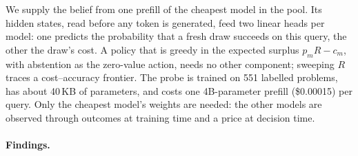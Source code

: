 \documentclass[10pt]{article} %
\begin{document}
We supply the belief from one prefill of the cheapest model in the pool.  Its hidden states,
read before any token is generated, feed two linear heads per model: one predicts the probability
that a fresh draw succeeds on this query, the other the draw's cost.  A policy that is greedy in
the expected surplus $p_mR-c_m$, with abstention as the zero-value action, needs no other
component; sweeping $R$ traces a cost--accuracy frontier.  The probe is trained on 551 labelled
problems, has about 40\,KB of parameters, and costs one 4B-parameter prefill (\$0.00015) per
query.  Only the cheapest model's weights are needed: the other models are observed through
outcomes at training time and a price at decision time.

\paragraph{Findings.}
\end{document}
